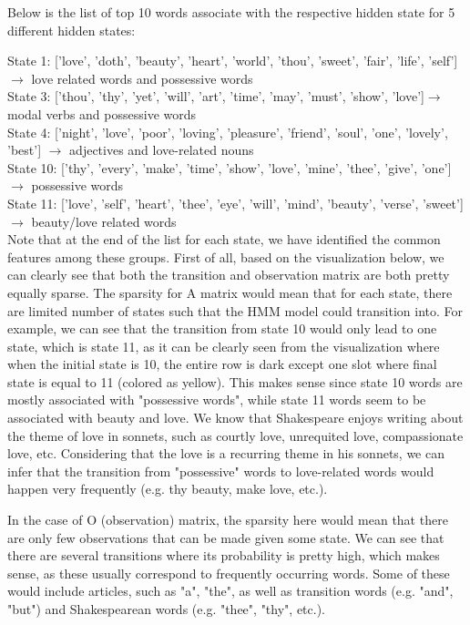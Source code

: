 \documentclass{article}
\begin{document}
Below is the list of top 10 words associate with the respective hidden state for 5 different hidden states: \newline

State 1: ['love', 'doth', 'beauty', 'heart', 'world', 'thou', 'sweet', 'fair', 'life', 'self'] $\rightarrow$ love related words and possessive words \\
State 3: ['thou', 'thy', 'yet', 'will', 'art', 'time', 'may', 'must', 'show', 'love']$\rightarrow$ modal verbs and possessive words\\
State 4: ['night', 'love', 'poor', 'loving', 'pleasure', 'friend', 'soul', 'one', 'lovely', 'best'] $\rightarrow$ adjectives and love-related nouns\\
State 10: ['thy', 'every', 'make', 'time', 'show', 'love', 'mine', 'thee', 'give', 'one'] $\rightarrow$ possessive words \\
State 11: ['love', 'self', 'heart', 'thee', 'eye', 'will', 'mind', 'beauty', 'verse', 'sweet'] $\rightarrow$ beauty/love related words\\


Note that at the end of the list for each state, we have identified the common features among these groups. First of all, based on the visualization below, we can clearly see that both the transition and observation matrix are both pretty equally sparse. The sparsity for A matrix would mean that for each state, there are limited number of states such that the HMM model could transition into. For example, we can see that the transition from state 10 would only lead to one state, which is state 11, as it can be clearly seen from the visualization where when the initial state is 10, the entire row is dark except one slot where final state is equal to 11 (colored as yellow). This makes sense since state 10 words are mostly associated with "possessive words", while state 11 words seem to be associated with beauty and love. We know that Shakespeare enjoys writing about the theme of love in sonnets, such as courtly love, unrequited love, compassionate love, etc. Considering that the love is a recurring theme in his sonnets, we can infer that the transition from "possessive" words to love-related words would happen very frequently (e.g. thy beauty, make love, etc.). 

In the case of O (observation) matrix, the sparsity here would mean that there are only few observations that can be made given some state. We can see that there are several transitions where its probability is pretty high, which makes sense, as these usually correspond to frequently occurring words. Some of these would include articles, such as "a", "the", as well as transition words (e.g. "and", "but") and Shakespearean words (e.g. "thee", "thy", etc.).
\end{document}
